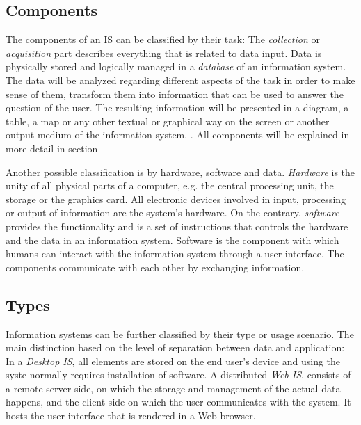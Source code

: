 \subsection{Components} %
\label{ssub:components_is}


The components of an IS can be classified by their task: The \emph{collection} or \emph{acquisition} part describes everything that is related to data input. Data is physically stored and logically managed in a \emph{database} of an information system. The data will be analyzed regarding different aspects of the task in order to make sense of them, transform them into information that can be used to answer the question of the user. The resulting information will be presented in a diagram, a table, a map or any other textual or graphical way on the screen or another output medium of the information system.
\cite{informationSystem}.
All components will be explained in more detail in section %

Another possible classification is by hardware, software and data. \emph{Hardware} is the unity of all physical parts of a computer, e.g. the central processing unit, the storage or the graphics card. All electronic devices involved in input, processing or output of information are the system's hardware. On the contrary, \emph{software} provides the functionality and is a set of instructions that controls the hardware and the data in an information system. Software is the component with which humans can interact with the information system through a user interface. The components communicate with each other by exchanging information.



\subsection{Types} %
\label{ssub:types}

Information systems can be further classified by their type or usage scenario. The main distinction based on the level of separation between data and application: In a \emph{Desktop IS}, all elements are stored on the end user's device and using the syste normally requires installation of software. A distributed \emph{Web IS}, consists of a remote server side, on which the storage and management of the actual data happens, and the client side on which the user communicates with the system. It hosts the user interface that is rendered in a Web browser.

